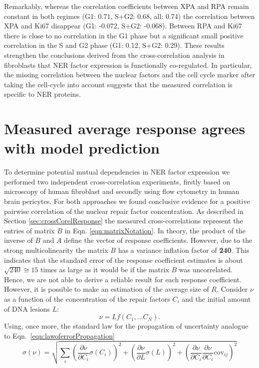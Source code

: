 Remarkably, whereas the correlation coefficients between XPA and RPA remain constant in both regimes (G1: 0.71, S+G2: 0.68, all: 0.74) the correlation between XPA and Ki67 disappear (G1: -0.072, S+G2: -0.068). Between RPA and Ki67 there is close to no correlation in the G1 phase but a significant small positive correlation in the S and G2 phase (G1: 0.12, S+G2: 0.29). These results strengthen the conclusions derived from the cross-correlation analysis in fibroblasts that NER factor expression is functionally co-regulated. In particular, the missing correlation between the nuclear factors and the cell cycle marker after taking the cell-cycle into account suggests that the measured correlation is specific to NER proteins. 


\section{Measured average response agrees with model prediction}
To determine potential mutual dependencies in NER factor expression we performed two independent cross-correlation experiments, firstly based on microscopy of human fibroblast and secondly using flow cytometry in human brain pericytes. For both approaches we found conclusive evidence for a positive pairwise correlation of the nuclear repair factor concentration. As described in Section \ref{sec:crossCorelResponse} the measured cross-correlations represent the entries of matrix $B$ in Eqn. \ref{eqn:matrixNotation}. In theory, the product of the inverse of $B$ and $A$ define the vector of response coefficients. However, due to the strong multicolinearity the matrix $B$ has a variance inflation factor of \textbf{240}. This indicates that the standard error of the response coefficient estimates is about $\sqrt{240} \cong 15$ times as large as it would be if the matrix $B$ was uncorrelated.\\   
Hence, we are not able to derive a reliable result for each response coefficient. However, it is possible to make an estimation of the average size of $R$. Consider $\nu$ as a function of the concentration of the repair factors $C_i$ and the initial amount of DNA lesions $L$:
\begin{equation}
	\nu = Lf(C_1,...C_N).
\end{equation}
Using, once more, the standard law for the propagation of uncertainty analogue to Eqn.\ \ref{eqn:lawoferrorPropagation}
 \begin{equation}
 \sigma(\nu) = \sqrt{\sum_{i}\left(\frac{\partial \nu}{\partial C_i}\sigma(C_i) \right)^2 + \left(\frac{\partial \nu}{\partial L}\sigma(L)\right)^2 + \left(\frac{\partial \nu}{\partial C_i} \frac{\partial \nu}{\partial C_i}\textrm{cov}_{ij}\right)^2}
 \end{equation}  
 
